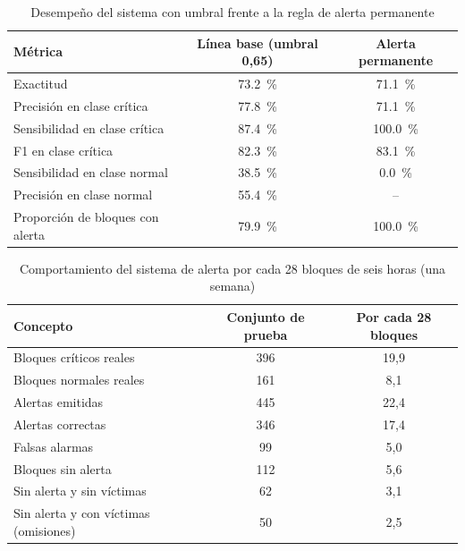 \begin{table}[htbp]
\centering
\caption{Desempeño del sistema con umbral frente a la regla de alerta permanente}
\label{tab:res-baseline-referencia}
\begin{tabularx}{\linewidth}{@{}>{\raggedright\arraybackslash}Xcc@{}}
\toprule
\textbf{Métrica} & \textbf{Línea base (umbral 0,65)} & \textbf{Alerta permanente} \\
\midrule
Exactitud & \qty{73.2}{\percent} & \qty{71.1}{\percent} \\
Precisión en clase crítica & \qty{77.8}{\percent} & \qty{71.1}{\percent} \\
Sensibilidad en clase crítica & \qty{87.4}{\percent} & \qty{100.0}{\percent} \\
F1 en clase crítica & \qty{82.3}{\percent} & \qty{83.1}{\percent} \\
Sensibilidad en clase normal & \qty{38.5}{\percent} & \qty{0.0}{\percent} \\
Precisión en clase normal & \qty{55.4}{\percent} & -- \\
Proporción de bloques con alerta & \qty{79.9}{\percent} & \qty{100.0}{\percent} \\
\bottomrule
\end{tabularx}
\end{table}

\begin{table}[htbp]
\centering
\caption{Comportamiento del sistema de alerta por cada 28 bloques de seis horas (una semana)}
\label{tab:res-operativa}
\begin{tabularx}{\linewidth}{@{}>{\raggedright\arraybackslash}Xcc@{}}
\toprule
\textbf{Concepto} & \textbf{Conjunto de prueba} & \textbf{Por cada 28 bloques} \\
\midrule
Bloques críticos reales & 396 & 19,9 \\
Bloques normales reales & 161 & 8,1 \\
\midrule
Alertas emitidas & 445 & 22,4 \\
\quad Alertas correctas & 346 & 17,4 \\
\quad Falsas alarmas & 99 & 5,0 \\
Bloques sin alerta & 112 & 5,6 \\
\quad Sin alerta y sin víctimas & 62 & 3,1 \\
\quad Sin alerta y con víctimas (omisiones) & 50 & 2,5 \\
\bottomrule
\end{tabularx}
\end{table}

